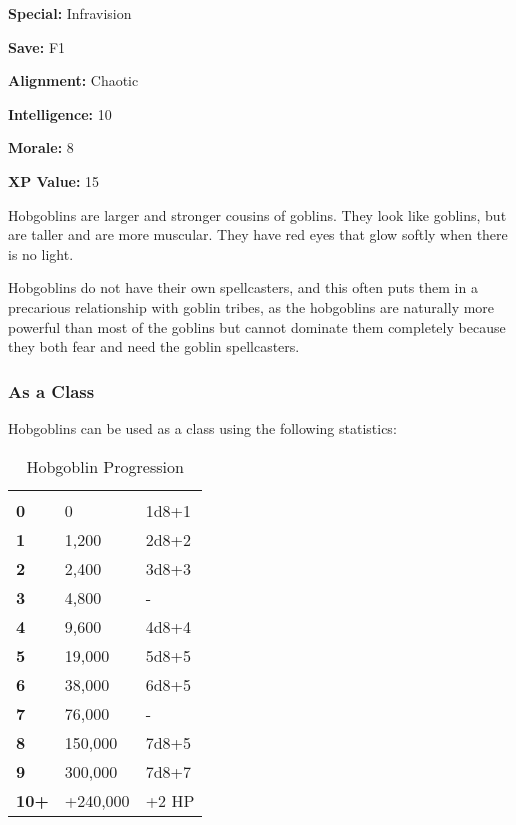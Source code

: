 \begin{multicols*}{2}
{{\textbf{Special:} Infravision

\textbf{Save:} F1

\textbf{Alignment:} Chaotic

\textbf{Intelligence:} 10

\textbf{Morale:} 8

\textbf{XP Value:} 15} }

Hobgoblins are larger and stronger cousins of goblins. They look like goblins, but are taller and are more muscular. They have red eyes that glow softly when there is no light.

Hobgoblins do not have their own spellcasters, and this often puts them in a precarious relationship with goblin tribes, as the hobgoblins are naturally more powerful than most of the goblins but cannot dominate them completely because they both fear and need the goblin spellcasters.

\subsubsection{As a Class}
Hobgoblins can be used as a class using the following statistics:


\begin {table}[H]
  \caption{Hobgoblin Progression}
  \begin{tabularx}{\columnwidth}{>{\bfseries}YYY}
	 &  & \\
	0 & 0 & 1d8+1\\
	1 & 1,200 & 2d8+2\\
	2 & 2,400 & 3d8+3\\
	3 & 4,800 & -\\
	4 & 9,600 & 4d8+4\\
	5 & 19,000 & 5d8+5\\
	6 & 38,000 & 6d8+5\\
	7 & 76,000 & -\\
	8 & 150,000 & 7d8+5\\
	9 & 300,000 & 7d8+7\\
	10+ & +240,000 & +2 HP
  \end {tabularx}
\end {table}


\end{multicols*}
